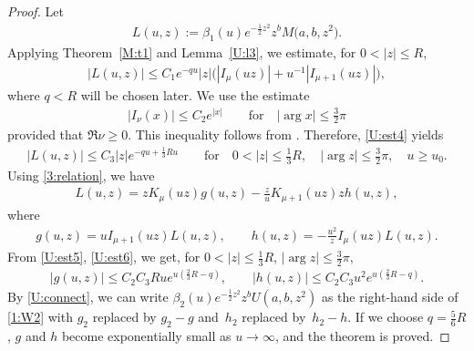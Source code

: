 \documentclass[pdftex]{sigma}
\numberwithin{equation}{section}
\begin{document}
\begin{proof}
Let
\begin{gather*} L(u,z):=\beta_1(u)e^{-\frac12z^2}z^bM\big(a,b,z^2\big) .\end{gather*}
Applying Theorem~\ref{M:t1} and Lemma~\ref{U:l3}, we estimate, for $0<|z|\le R$,
\begin{gather}\label{U:est4}
 |L(u,z)|\le C_1 e^{-qu} |z|\big(|I_\mu(uz)|+u^{-1}|I_{\mu+1}(uz)|\big) ,
 \end{gather}
where $q<R$ will be chosen later.
We use the estimate
\begin{gather}\label{U:est5}
 |I_\nu(x)|\le C_2 e^{|x|} \qquad \text{for} \quad |\arg x|\le \frac32\pi
\end{gather}
provided that $\Re \nu\ge 0$. This inequality follows from \cite[(9.2), (9.3)]{O}.
Therefore, \eqref{U:est4} yields
\begin{gather}\label{U:est6}
|L(u,z)|\le C_3 |z|e^{-qu+\frac13Ru}\qquad\text{for}\quad 0<|z|\le \frac13R, \quad |\arg z|\le \frac32\pi, \quad u\ge u_0.
\end{gather}
Using \eqref{3:relation}, we have
\begin{gather*} L(u,z)=zK_\mu(uz)g(u,z)-\frac{z}{u}K_{\mu+1}(uz) zh(u,z), \end{gather*}
where
\begin{gather*}
g(u,z) = uI_{\mu+1}(uz) L(u,z),\qquad
h(u,z) = -\frac{u^2}{z} I_\mu(uz)L(u,z) .
\end{gather*}
From \eqref{U:est5}, \eqref{U:est6}, we get, for $0<|z|\le \frac13R$, $|\arg z|\le \frac32\pi$,
\begin{gather*}
|g(u,z)| \le C_2C_3R u e^{u(\frac23R-q)},\qquad
|h(u,z)| \le C_2C_3 u^2 e^{u(\frac23R-q)} .
\end{gather*}
By \eqref{U:connect}, we can write $\beta_2(u)e^{-\frac12z^2}z^bU(a,b,z^2)$ as the right-hand side of \eqref{1:W2} with $g_2$ replaced by $g_2-g$
and~$h_2$ replaced
by~$h_2-h$. If we choose $q=\frac56R$, $g$ and $h$ become exponentially small as $u\to\infty$, and the theorem is proved.
\end{proof}
\end{document}
